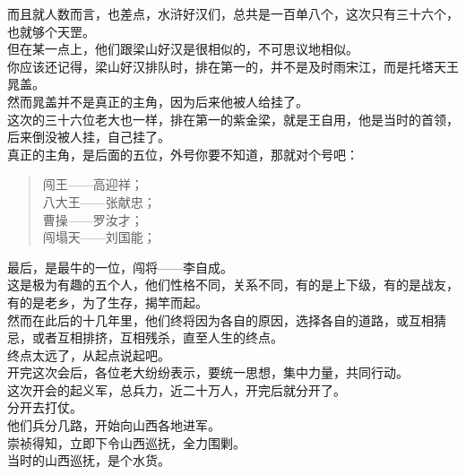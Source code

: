 \begin{multicols}{\theparacolNo}
而且就人数而言，也差点，水浒好汉们，总共是一百单八个，这次只有三十六个，也就够个天罡。\\

但在某一点上，他们跟梁山好汉是很相似的，不可思议地相似。\\

你应该还记得，梁山好汉排队时，排在第一的，并不是及时雨宋江，而是托塔天王晁盖。\\

然而晁盖并不是真正的主角，因为后来他被人给挂了。\\

这次的三十六位老大也一样，排在第一的紫金梁，就是王自用，他是当时的首领，后来倒没被人挂，自己挂了。\\

真正的主角，是后面的五位，外号你要不知道，那就对个号吧：\\

{\footnotesize \begin{quote}
	闯王——高迎祥；\\
	八大王——张献忠；\\
	曹操——罗汝才；\\
	闯塌天——刘国能；\\
\end{quote}}

最后，是最牛的一位，闯将——李自成。\\

这是极为有趣的五个人，他们性格不同，关系不同，有的是上下级，有的是战友，有的是老乡，为了生存，揭竿而起。\\

然而在此后的十几年里，他们终将因为各自的原因，选择各自的道路，或互相猜忌，或者互相排挤，互相残杀，直至人生的终点。\\

终点太远了，从起点说起吧。\\

开完这次会后，各位老大纷纷表示，要统一思想，集中力量，共同行动。\\

这次开会的起义军，总兵力，近二十万人，开完后就分开了。\\

分开去打仗。\\

他们兵分几路，开始向山西各地进军。\\

崇祯得知，立即下令山西巡抚，全力围剿。\\

当时的山西巡抚，是个水货。\\


\end{multicols}
